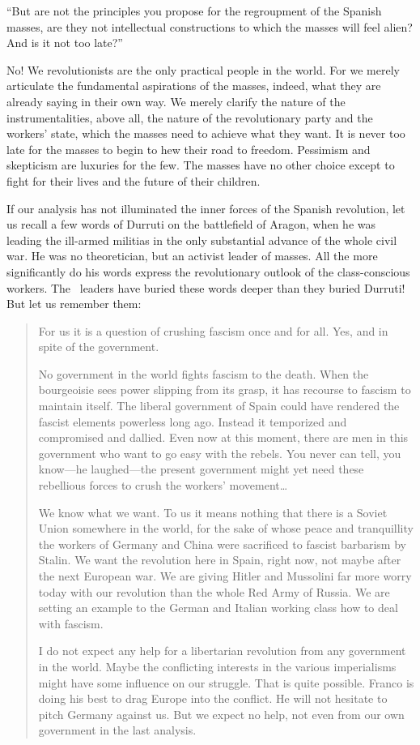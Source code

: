 ``But are not the principles you propose for the regroupment of the Spanish masses, are they not intellectual constructions to which the masses will feel alien? And is it not too late?''

No! We revolutionists are the only practical people in the world. For we merely articulate the fundamental aspirations of the masses, indeed, what they are already saying in their own way. We merely clarify the nature of the instrumentalities, above all, the nature of the revolutionary party and the workers’ state, which the masses need to achieve what they want. It is never too late for the masses to begin to hew their road to freedom. Pessimism and skepticism are luxuries for the few. The masses have no other choice except to fight for their lives and the future of their children.

If our analysis has not illuminated the inner forces of the Spanish revolution, let us recall a few words of Durruti on the battlefield of Aragon, when he was leading the ill-armed militias in the only substantial advance of the whole civil war. He was no theoretician, but an activist leader of masses. All the more significantly do his words express the revolutionary outlook of the class-conscious workers. The \CNT\ leaders have buried these words deeper than they buried Durruti! But let us remember them:

\begin{quotation}
  For us it is a question of crushing fascism once and for all. Yes, and in spite of the government.
  
  No government in the world fights fascism to the death. When the bourgeoisie sees power slipping from its grasp, it has recourse to fascism to maintain itself. The liberal government of Spain could have rendered the fascist elements powerless long ago. Instead it temporized and compromised and dallied. Even now at this moment, there are men in this government who want to go easy with the rebels. You never can tell, you know—he laughed—the present government might yet need these rebellious forces to crush the workers’ movement\dots
  
  We know what we want. To us it means nothing that there is a Soviet Union somewhere in the world, for the sake of whose peace and tranquillity the workers of Germany and China were sacrificed to fascist barbarism by Stalin. We want the revolution here in Spain, right now, not maybe after the next European war. We are giving Hitler and Mussolini far more worry today with our revolution than the whole Red Army of Russia. We are setting an example to the German and Italian working class how to deal with fascism.
  
  I do not expect any help for a libertarian revolution from any government in the world. Maybe the conflicting interests in the various imperialisms might have some influence on our struggle. That is quite possible. Franco is doing his best to drag Europe into the conflict. He will not hesitate to pitch Germany against us. But we expect no help, not even from our own government in the last analysis.
\end{quotation}

